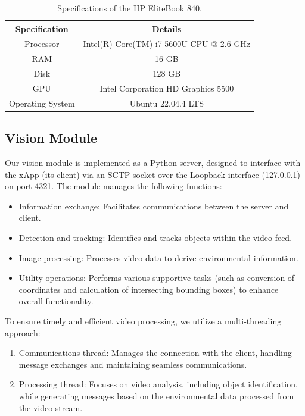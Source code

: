 \begin{table}[H]
    \caption{Specifications of the HP EliteBook 840.}
    \label{tab:specs_pc_ue}
    \begin{tabular}{|c|c|}
        \hline
        \textbf{Specification} & \textbf{Details} \\ \hline
        Processor                      &  Intel(R) Core(TM) i7-5600U CPU @ 2.6 GHz          \\ \hline
        RAM                      &          16 GB        \\ \hline
        Disk                      &   128 GB         \\ \hline
        GPU                     &   Intel Corporation HD Graphics 5500                \\ \hline
        Operating System & Ubuntu 22.04.4 LTS                  \\ \hline  %
    \end{tabular}
\end{table}


\subsection{Vision Module}\label{subsec:vision-module}
Our vision module is implemented as a Python server, designed to interface with the xApp (its client) via an SCTP socket over the Loopback interface (127.0.0.1) on port 4321.
The module manages the following functions:

\begin{itemize}
\item Information exchange: Facilitates communications between the server and client.
\item Detection and tracking: Identifies and tracks objects within the video feed.
\item Image processing: Processes video data to derive environmental information.
\item Utility operations: Performs various supportive tasks (such as conversion of coordinates and calculation of intersecting bounding boxes) to enhance overall functionality.
\end{itemize}

To ensure timely and efficient video processing, we utilize a multi-threading approach:

\begin{enumerate}
\item Communications thread: Manages the connection with the client, handling message exchanges and maintaining seamless communications.
\item Processing thread: Focuses on video analysis, including object identification, while generating messages based on the environmental data processed from the video stream.
\end{enumerate}

